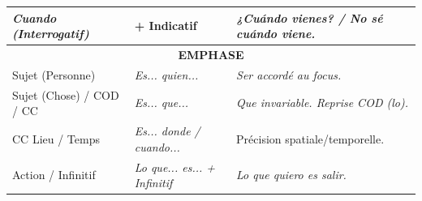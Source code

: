 \documentclass[11pt]{article}
\newcommand{\esp}[1]{\ifmmode\text{\textit{#1}}\else\begingroup\selectlanguage{spanish}\itshape #1\endgroup\fi}
\begin{document}
\begin{aretenir}
\begin{center}
\begin{tabularx}{\linewidth}{|X|X|X|}
\hline
\esp{Cuando} (Interrogatif) & + \textbf{Indicatif} & \esp{¿Cuándo vienes?} / \esp{No sé cuándo viene.} \\
\hline
\multicolumn{3}{|c|}{\cellcolor{poppinkL}\textbf{EMPHASE}} \\
\hline
Sujet (Personne) & \esp{Es... quien...} & \esp{Ser} accordé au focus. \\
\hline
Sujet (Chose) / COD / CC & \esp{Es... que...} & \esp{Que} invariable. Reprise COD (\esp{lo}). \\
\hline
CC Lieu / Temps & \esp{Es... donde / cuando...} & Précision spatiale/temporelle. \\
\hline
Action / Infinitif & \esp{Lo que... es...} + Infinitif & \esp{Lo que quiero es salir.} \\
\hline
\end{tabularx}
\end{center}
\end{aretenir}
\end{document}
